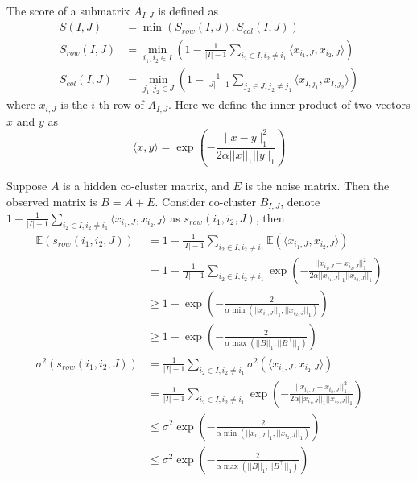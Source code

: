 The score of a submatrix $A_{I,J}$ is defined as
\begin{align}
    S(I,J)       & = \min(S_{row}(I,J), S_{col}(I,J))                                                                                          \\
    S_{row}(I,J) & = \min_{i_1, i_2 \in I} \left(1- \frac{1}{|I|-1} \sum_{i_2 \in I, i_2 \neq i_1} \langle x_{i_1,J}, x_{i_2,J}\rangle \right) \\
    S_{col}(I,J) & = \min_{j_1, j_2 \in J} \left(1- \frac{1}{|J|-1} \sum_{j_2 \in J, j_2 \neq j_1} \langle x_{I,j_1}, x_{I,j_2}\rangle \right)
\end{align}
where $x_{i,J}$ is the $i$-th row of $A_{I,J}$. Here we define the inner product of two vectors $x$ and $y$ as
$$\langle x, y \rangle = \exp(-\frac{||x - y||_1^2}{2\alpha||x||_1||y||_1})$$

Suppose $A$ is a hidden co-cluster matrix, and $E$ is the noise matrix. Then the observed matrix is $B = A + E$. Consider co-cluster $B_{I,J}$, denote $1 - \frac{1}{|I|-1} \sum_{i_2 \in I, i_2 \neq i_1} \langle x_{i_1,J}, x_{i_2,J}\rangle$ as $s_{row}(i_1, i_2, J)$, then
\begin{align*}
    \mathbb{E}(s_{row}(i_1, i_2, J)) & = 1 - \frac{1}{|I|-1} \sum_{i_2 \in I, i_2 \neq i_1} \mathbb{E}(\langle x_{i_1,J}, x_{i_2,J}\rangle)                                    \\
                                     & = 1 - \frac{1}{|I|-1} \sum_{i_2 \in I, i_2 \neq i_1} \exp(-\frac{||x_{i_1,J} - x_{i_2,J}||_1^2}{2\alpha||x_{i_1,J}||_1||x_{i_2,J}||_1}) \\
                                     & \ge 1 - \exp(-\frac{2}{\alpha \min(||x_{i_1,J}||_1, ||x_{i_2,J}||_1)})                                                                  \\
                                     & \ge 1 - \exp(-\frac{2}{\alpha \max(||B||_1, ||B^\top||_1)})                                                                             \\
    \sigma^2(s_{row}(i_1, i_2, J))   & = \frac{1}{|I|-1} \sum_{i_2 \in I, i_2 \neq i_1} \sigma^2(\langle x_{i_1,J}, x_{i_2,J}\rangle)                                          \\
                                     & = \frac{1}{|I|-1} \sum_{i_2 \in I, i_2 \neq i_1} \exp(-\frac{||x_{i_1,J} - x_{i_2,J}||_1^2}{2\alpha||x_{i_1,J}||_1||x_{i_2,J}||_1})     \\
                                     & \le \sigma^2 \exp(-\frac{2}{\alpha \min(||x_{i_1,J}||_1, ||x_{i_2,J}||_1)})                                                             \\
                                     & \le \sigma^2 \exp(-\frac{2}{\alpha \max(||B||_1, ||B^\top||_1)})                                                                        \\
\end{align*}

